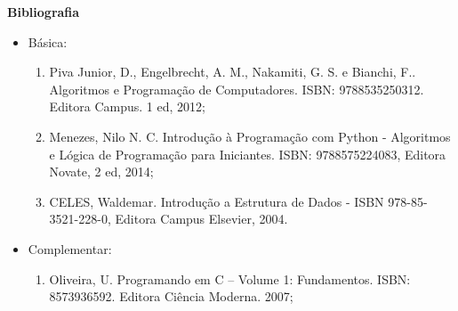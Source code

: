 




\begin{snugshade}\begin{center}\textbf{
    Bibliografia
}\end{center}\end{snugshade}

\begin{itemize} 
  \item Básica:
	\begin{enumerate}
		\item Piva Junior, D., Engelbrecht,  A. M., Nakamiti,  G. S. e Bianchi, F.. Algoritmos e Programação de Computadores. ISBN: 9788535250312. Editora Campus. 1 ed, 2012;
		\item Menezes, Nilo N. C. Introdução à Programação com Python - Algoritmos e Lógica de Programação para Iniciantes. ISBN: 9788575224083, Editora Novate, 2 ed, 2014;
		\item CELES, Waldemar. Introdução a Estrutura de Dados -  ISBN 978-85-3521-228-0, Editora Campus Elsevier, 2004.
	\end{enumerate}
  \item Complementar:
	\begin{enumerate} 
		\item Oliveira, U. Programando em C – Volume 1: Fundamentos. ISBN: 8573936592. Editora Ciência Moderna. 2007;
	\end{enumerate}
\end{itemize}
